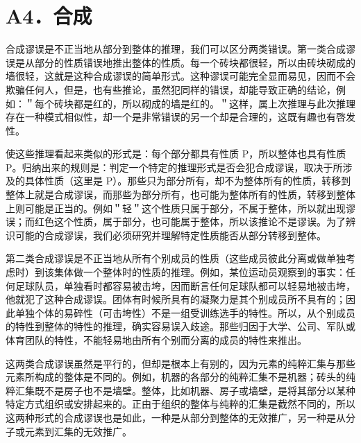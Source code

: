 \section*{A4．合成}
合成谬误是不正当地从部分到整体的推理，我们可以区分两类错误。第一类合成谬误是从部分的性质错误地推出整体的性质。每一个砖块都很轻，所以由砖块砌成的墙很轻，这就是这种合成谬误的简单形式。这种谬误可能完全显而易见，因而不会欺骗任何人，但是，也有些推论，虽然犯同样的错误，却能导致正确的结论，例如：＂每个砖块都是红的，所以砌成的墙是红的。＂这样，属上次推理与此次推理存在一种模式相似性，却一个是非常错误的另一个却是合理的，这既有趣也有啓发性。

使这些推理看起来类似的形式是：每个部分都具有性质 P，所以整体也具有性质 P。归纳出来的规则是：判定一个特定的推理形式是否会犯合成谬误，取决于所涉及的具体性质（这里是 P）。那些只为部分所有，却不为整体所有的性质，转移到整体上就是合成谬误，而那些为部分所有，也可能为整体所有的性质，转移到整体上则可能是正当的。例如＂轻＂这个性质只属于部分，不属于整体，所以就出现谬误；而红色这个性质，属于部分，也可能属于整体，所以该推论不是谬误。为了辨识可能的合成谬误，我们必须研究并理解特定性质能否从部分转移到整体。

第二类合成谬误是不正当地从所有个别成员的性质（这些成员彼此分离或做单独考虑时）到该集体做一个整体时的性质的推理。例如，某位运动员观察到的事实：任何足球队员，单独看时都容易被击垮，因而断言任何足球队都可以轻易地被击垮，他就犯了这种合成谬误。团体有时候所具有的凝聚力是其个别成员所不具有的；因此单独个体的易碎性（可击垮性）不是一组受训练选手的特性。所以，从个别成员的特性到整体的特性的推理，确实容易误入歧途。那些归因于大学、公司、军队或体育团队的特性，不能轻易地由所有个别而分离的成员的特性来推出。

这两类合成谬误虽然是平行的，但却是根本上有别的，因为元素的纯粹汇集与那些元素所构成的整体是不同的。例如，机器的各部分的纯粹汇集不是机器；砖头的纯粹汇集既不是房子也不是墙壁。整体，比如机器、房子或墙壁，是将其部分以某种特定方式组织或安排起来的。正由于组织的整体与纯粹的汇集是截然不同的，所以这两种形式的合成谬误也是如此，一种是从部分到整体的无效推广，另一种是从分子或元素到汇集的无效推广。 